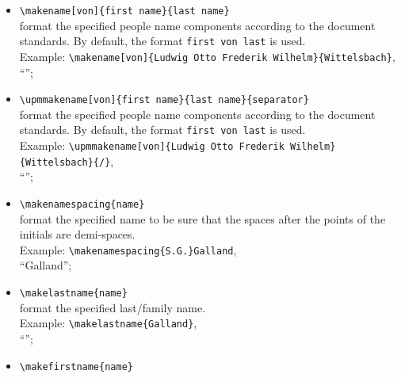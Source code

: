 \documentclass[book,taskpackage,specpackage,codepackage]{upmethodology-document}
\begin{document}
\begin{itemize}
	put a \emph{very important} text. This command is similar to the standard \LaTeX\ command \texttt{{\textbackslash}emph}. The difference is: \texttt{{\textbackslash}emph} is for ``important things''; and \texttt{{\textbackslash}Emph} is for ``very important things''.\\
	Example: This text is \texttt{{\textbackslash}emph\{important\}}, but this one is \texttt{{\textbackslash}Emph\{very important\}} \\
	gives: This text is \emph{important}, but this one is ;
\item \texttt{{\textbackslash}makename[von]\{first name\}\{last name\}} \\
	format the specified people name components according to the document standards. By default, the format \texttt{first von last} is used. \\
	Example: \texttt{{\textbackslash}makename[von]\{Ludwig Otto Frederik Wilhelm\}\{Wittelsbach\}},\\
		``'';
\item \texttt{{\textbackslash}upmmakename[von]\{first name\}\{last name\}\{separator\}} \\
	format the specified people name components according to the document standards. By default, the format \texttt{first von last} is used. \\
	Example: \texttt{{\textbackslash}upmmakename[von]\{Ludwig Otto Frederik Wilhelm\}\{Wittelsbach\}\{/\}}, \\
		``'';
\item \texttt{{\textbackslash}makenamespacing\{name\}} \\
	format the specified name to be sure that the spaces after the points of the initials are demi-spaces. \\
	Example: \texttt{{\textbackslash}makenamespacing\{S\string.G\string.\}Galland}, \\
		``Galland'';
\item \texttt{{\textbackslash}makelastname\{name\}} \\
	format the specified last/family name. \\
	Example: \texttt{{\textbackslash}makelastname\{Galland\}}, \\
		``'';
\item \texttt{{\textbackslash}makefirstname\{name\}} \\

\end{itemize}
\end{document}
